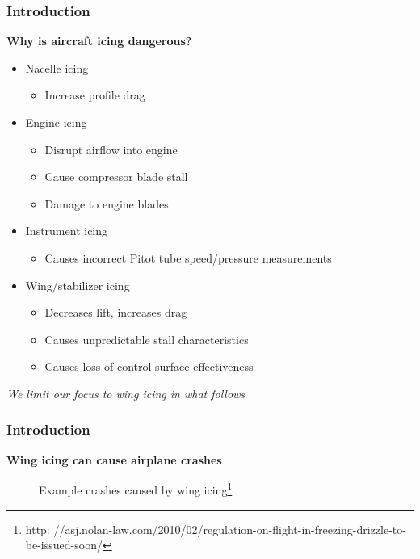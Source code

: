 \documentclass[9pt]{beamer}
\begin{document}
\begin{frame}
\frametitle{Introduction}
\label{sec-1-2}

\textbf{Why is aircraft icing dangerous?}
\begin{itemize}
\item Nacelle icing
\begin{itemize}
\item Increase profile drag
\end{itemize}
\item Engine icing
\begin{itemize}
\item Disrupt airflow into engine
\item Cause compressor blade stall
\item Damage to engine blades
\end{itemize}
\item Instrument icing
\begin{itemize}
\item Causes incorrect Pitot tube speed/pressure measurements
\end{itemize}
\item Wing/stabilizer icing
\begin{itemize}
\item Decreases lift, increases drag
\item Causes unpredictable stall characteristics
\item Causes loss of control surface effectiveness
\end{itemize}
\end{itemize}
\emph{We limit our focus to wing icing in what follows}
\end{frame}
\begin{frame}
\frametitle{Introduction}
\label{sec-1-3}

\textbf{Wing icing can cause airplane crashes}
\begin{figure}
   \caption{Example crashes caused by wing icing\footnote{\tiny http: //asj.nolan-law.com/2010/02/regulation-on-flight-in-freezing-drizzle-to-be-issued-soon/}}
\end{figure}
\end{frame}
\end{document}
